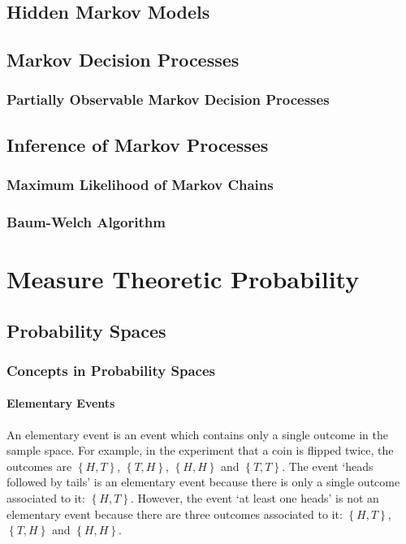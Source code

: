 \documentclass[11pt]{report} %
\begin{document}
\section{Hidden Markov Models}

\section{Markov Decision Processes}

\subsection{Partially Observable Markov Decision Processes}

\section{Inference of Markov Processes}

\subsection{Maximum Likelihood of Markov Chains}

\subsection{Baum-Welch Algorithm}

\chapter{Measure Theoretic Probability}

\section{Probability Spaces}

\subsection{Concepts in Probability Spaces}

\subsubsection{Elementary Events}
An elementary event is an event which contains only a single outcome in the sample space. For example, in the experiment that a coin is flipped twice, the outcomes are $\left\{H, T\right\}$, $\left\{T, H\right\}$, $\left\{H, H\right\}$ and $\left\{T, T\right\}$. The event `heads followed by tails' is an elementary event because there is only a single outcome associated to it: $\left\{H, T\right\}$. However, the event `at least one heads' is not an elementary event because there are three outcomes associated to it: $\left\{H, T\right\}$, $\left\{T, H\right\}$ and $\left\{H, H\right\}$.
\end{document}

